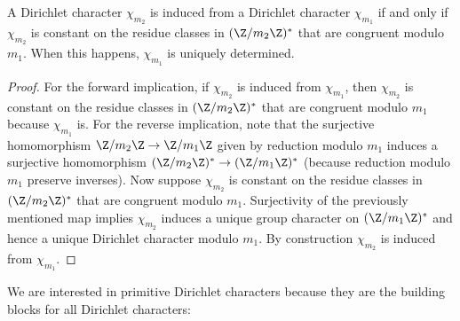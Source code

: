       \begin{proposition}\label{prop:Dirichlet_character_induction_classification}
        A Dirichlet character $\chi_{m_{2}}$ is induced from a Dirichlet character $\chi_{m_{1}}$ if and only if $\chi_{m_{2}}$ is constant on the residue classes in $(\Z/m_{2}\Z)^{\ast}$ that are congruent modulo $m_{1}$. When this happens, $\chi_{m_{1}}$ is uniquely determined.
      \end{proposition}
      \begin{proof}
        For the forward implication, if $\chi_{m_{2}}$ is induced from $\chi_{m_{1}}$, then $\chi_{m_{2}}$ is constant on the residue classes in $(\Z/m_{2}\Z)^{\ast}$ that are congruent modulo $m_{1}$ because $\chi_{m_{1}}$ is. For the reverse implication, note that the surjective homomorphism $\Z/m_{2}\Z \to \Z/m_{1}\Z$ given by reduction modulo $m_{1}$ induces a surjective homomorphism $(\Z/m_{2}\Z)^{\ast} \to (\Z/m_{1}\Z)^{\ast}$ (because reduction modulo $m_{1}$ preserve inverses). Now suppose $\chi_{m_{2}}$ is constant on the residue classes in $(\Z/m_{2}\Z)^{\ast}$ that are congruent modulo $m_{1}$. Surjectivity of the previously mentioned map implies $\chi_{m_{2}}$ induces a unique group character on $(\Z/m_{1}\Z)^{\ast}$ and hence a unique Dirichlet character modulo $m_{1}$. By construction $\chi_{m_{2}}$ is induced from $\chi_{m_{1}}$.
      \end{proof}

      We are interested in primitive Dirichlet characters because they are the building blocks for all Dirichlet characters:


